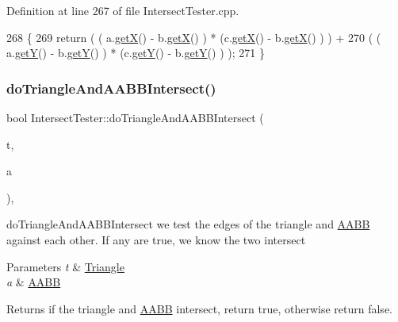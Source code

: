 Definition at line 267 of file Intersect\+Tester.\+cpp.


\begin{DoxyCode}
268 \{
269     \textcolor{keywordflow}{return} ( ( a.\hyperlink{class_point_a29c44ec7c7279e02629645a06cdaf7d5}{getX}() - b.\hyperlink{class_point_a29c44ec7c7279e02629645a06cdaf7d5}{getX}() ) * (c.\hyperlink{class_point_a29c44ec7c7279e02629645a06cdaf7d5}{getX}() - b.\hyperlink{class_point_a29c44ec7c7279e02629645a06cdaf7d5}{getX}() ) ) +
270            ( ( a.\hyperlink{class_point_a2371ffadbe245d12a8f556d0a976521b}{getY}() - b.\hyperlink{class_point_a2371ffadbe245d12a8f556d0a976521b}{getY}() ) * (c.\hyperlink{class_point_a2371ffadbe245d12a8f556d0a976521b}{getY}() - b.\hyperlink{class_point_a2371ffadbe245d12a8f556d0a976521b}{getY}() ) );
271 \}
\end{DoxyCode}
\mbox{\label{class_intersect_tester_acb2dbd261f6351d83cf7471a972b5b52}} 
\subsubsection{\texorpdfstring{do\+Triangle\+And\+A\+A\+B\+B\+Intersect()}{doTriangleAndAABBIntersect()}}
{\footnotesize\ttfamily bool Intersect\+Tester\+::do\+Triangle\+And\+A\+A\+B\+B\+Intersect (\begin{DoxyParamCaption}\item[{\hyperlink{class_triangle}{Triangle}}]{t,  }\item[{\hyperlink{class_a_a_b_b}{A\+A\+BB}}]{a }\end{DoxyParamCaption})\hspace{0.3cm}{\ttfamily [static]}, {\ttfamily [private]}}



do\+Triangle\+And\+A\+A\+B\+B\+Intersect we test the edges of the triangle and \hyperlink{class_a_a_b_b}{A\+A\+BB} against each other. If any are true, we know the two intersect 


\begin{DoxyParams}{Parameters}
{\em t} & \hyperlink{class_triangle}{Triangle} \\
\hline
{\em a} & \hyperlink{class_a_a_b_b}{A\+A\+BB} \\
\hline
\end{DoxyParams}
\begin{DoxyReturn}{Returns}
if the triangle and \hyperlink{class_a_a_b_b}{A\+A\+BB} intersect, return true, otherwise return false. 
\end{DoxyReturn}



